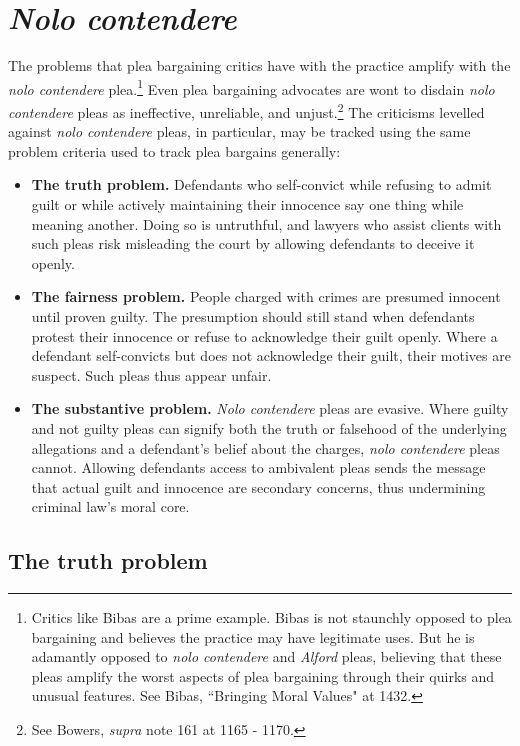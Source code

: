 \section{\textit{Nolo contendere}}

The problems that plea bargaining critics have with the practice amplify with the \textit{nolo contendere} plea.\footnote{Critics like Bibas are a prime example. Bibas is not staunchly opposed to plea bargaining and believes the practice may have legitimate uses. But he is adamantly opposed to \textit{nolo contendere} and \textit{Alford} pleas, believing that these pleas amplify the worst aspects of plea bargaining through their quirks and unusual features. See Bibas, ``Bringing Moral Values" at 1432.} Even plea bargaining advocates are wont to disdain \textit{nolo contendere} pleas as ineffective, unreliable, and unjust.\footnote{See Bowers, \textit{supra} note 161 at 1165 - 1170.} The criticisms levelled against \textit{nolo contendere} pleas, in particular, may be tracked using the same problem criteria used to track plea bargains generally:

\begin{itemize}
    \item \textbf{The truth problem.} Defendants who self-convict while refusing to admit guilt or while actively maintaining their innocence say one thing while meaning another. Doing so is untruthful, and lawyers who assist clients with such pleas risk misleading the court by allowing defendants to deceive it openly. 
    \item \textbf{The fairness problem.} People charged with crimes are presumed innocent until proven guilty. The presumption should still stand when defendants protest their innocence or refuse to acknowledge their guilt openly. Where a defendant self-convicts but does not acknowledge their guilt, their motives are suspect. Such pleas thus appear unfair. 
    \item \textbf{The substantive problem.} \textit{Nolo contendere} pleas are evasive. Where guilty and not guilty pleas can signify both the truth or falsehood of the underlying allegations and a defendant's belief about the charges, \textit{nolo contendere} pleas cannot. Allowing defendants access to ambivalent pleas sends the message that actual guilt and innocence are secondary concerns, thus undermining criminal law's moral core. 
    
\end{itemize}

\subsection{The truth problem}

